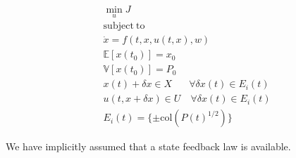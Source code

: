 \documentclass[10pt,a4paper]{article}
\begin{document}
\begin{align*}
&\min_u J \\
&\mathrm{subject\ to}\nonumber\\
&\dot{x} = f(t, x, u(t,x), w) \\
&\mathbb{E}[x(t_0)] = x_0 \\
&\mathbb{V}[x(t_0)] = P_0 \\
&x(t)+\delta x \in X \quad \; \ \ \forall \delta x(t)\in E_i(t)\\
&u(t,x+\delta x) \in U \quad \forall \delta x(t)\in E_i(t)\\	
&E_i(t) = \lbrace\pm\mathrm{col}(P(t)^{1/2})\rbrace
\end{align*}

We have implicitly assumed that a state feedback law is available. 

\end{document}
